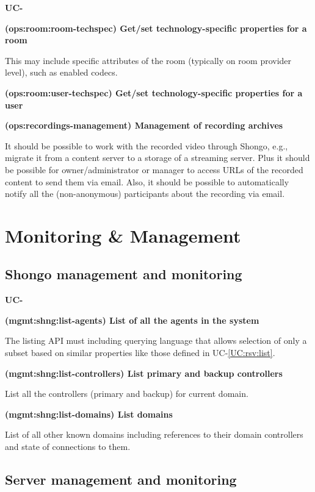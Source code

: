 \documentclass[a4paper]{report}
\makeatletter
\newcounter{UCcounter}
\newenvironment{UseCases}%
	{\begin{list}{\textbf{UC-\arabic{UCcounter}}}{\@nmbrlisttrue\def\@listctr{UCcounter}}}%
	{\end{list}}
\newcommand{\UClabel}[1]{\label{UC:#1}}
\newcommand{\UCref}[1]{UC-\ref{UC:#1}}
\newcommand{\UseCase}[2]{\item\UClabel{#2} \textbf{(#2) #1}\\ \nopagebreak}
\makeatother
\begin{document}
\begin{UseCases}
\UseCase{Get/set technology-specific properties for a
room}{ops:room:room-techspec}

This may include specific attributes of the room (typically on room provider
level), such as enabled codecs.

\UseCase{Get/set technology-specific properties for a
user}{ops:room:user-techspec}

\UseCase{Management of recording archives}{ops:recordings-management}

It should be possible to work with the recorded video through Shongo, e.g.,
migrate it from a content server to a storage of a streaming server. Plus it
should be possible for owner/administrator or manager to access URLs of the
recorded content to send them via email. Also, it should be possible to
automatically notify all the (non-anonymous) participants about the recording
via email.

\end{UseCases}



\section{Monitoring \& Management}

\subsection{Shongo management and monitoring}

\begin{UseCases}

\UseCase{List of all the agents in the system}{mgmt:shng:list-agents}

The listing API must including querying language that allows selection of only
a subset based on similar properties like those defined in \UCref{rsv:list}.

\UseCase{List primary and backup controllers}{mgmt:shng:list-controllers}

List all the controllers (primary and backup) for current domain.

\UseCase{List domains}{mgmt:shng:list-domains}

List of all other known domains including references to their domain
controllers and state of connections to them.

\end{UseCases}

\subsection{Server management and monitoring}
\end{document}
